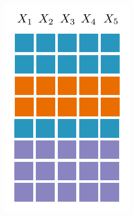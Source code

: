 \documentclass[final]{beamer}
\begin{document}
\begin{frame}{}
\begin{textblock}{60}
\begin{minipage}[t]{4.986cm}
      \includegraphics[width=\linewidth]{figures/grid-1}
    \end{minipage}\hspace{30pt}
\end{textblock}
\end{frame}
\end{document}
